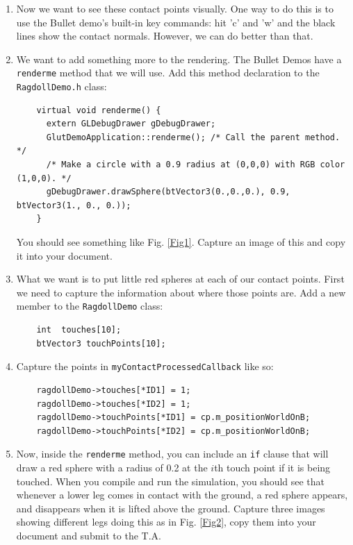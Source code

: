 \documentclass[12pt]{article}
\begin{document}
\begin{enumerate}
\item Now we want to see these contact points visually.  One way to do this is to use the Bullet demo's built-in key commands: hit 'c' and 'w' and the black lines show the contact normals.  However, we can do better than that.  

\item We want to add something more to the rendering.  The Bullet Demos have a \verb|renderme| method that we will use.  Add this method declaration to the \verb|RagdollDemo.h| class:
\begin{verbatim}
    virtual void renderme() {
      extern GLDebugDrawer gDebugDrawer;
      GlutDemoApplication::renderme(); /* Call the parent method. */
      /* Make a circle with a 0.9 radius at (0,0,0) with RGB color (1,0,0). */
      gDebugDrawer.drawSphere(btVector3(0.,0.,0.), 0.9, btVector3(1., 0., 0.));
    }
\end{verbatim}
You should see something like Fig. \ref{Fig1}.  Capture an image of this and copy it into your document.

\item What we want is to put little red spheres at each of our contact points.  First we need to capture the information about where those points are.  Add a new member to the \verb|RagdollDemo| class:
\begin{verbatim}
    int  touches[10];
    btVector3 touchPoints[10];
\end{verbatim}

\item Capture the points in \verb|myContactProcessedCallback| like so:
\begin{verbatim}
    ragdollDemo->touches[*ID1] = 1;
    ragdollDemo->touches[*ID2] = 1;
    ragdollDemo->touchPoints[*ID1] = cp.m_positionWorldOnB;
    ragdollDemo->touchPoints[*ID2] = cp.m_positionWorldOnB;
\end{verbatim}

\item Now, inside the \texttt{renderme} method, you can include an \texttt{if} clause that will draw a red sphere with a radius of 0.2 at the $i$th touch point if it is being touched. When you compile and run the simulation, you should see that whenever a lower leg comes in contact with the ground, a red sphere appears, and disappears when it is lifted above the ground. Capture three images showing different legs doing this as in Fig. \ref{Fig2}, copy them into your document and submit to the T.A.

\end{enumerate}
\end{document}
